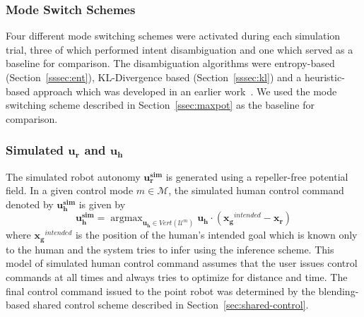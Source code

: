 \documentclass[conference]{IEEEtran}
\DeclareMathOperator*{\argmax}{argmax}
\begin{document}
\subsubsection{Mode Switch Schemes}
Four different mode switching schemes were activated during each simulation trial, three of which performed intent disambiguation and one which served as a baseline for comparison. The disambiguation algorithms were entropy-based (Section~\ref{sssec:ent}), KL-Divergence based (Section~\ref{sssec:kl}) and a heuristic-based approach which was developed in an earlier work~\citep{gopinath2017mode}. We used the mode switching scheme described in Section~\ref{ssec:maxpot} as the baseline for comparison. 
\subsubsection{Simulated $\boldsymbol{u_r}$ and $\boldsymbol{u_h}$}
The simulated robot autonomy $\boldsymbol{u^{sim}_r}$ is generated using a repeller-free potential field. In a given control mode $m \in \mathcal{M}$, the simulated human control command denoted by $\boldsymbol{u^{sim}_h}$ is given by
\begin{equation*}
\boldsymbol{u^{sim}_h} = \argmax_{\boldsymbol{u_h} \in Vert(\mathcal{U}^m)} \boldsymbol{u_h}\cdot(\boldsymbol{x_g}^{intended} - \boldsymbol{x_r})
\end{equation*}
where $\boldsymbol{x_g}^{intended}$ is the position of the human's intended goal which is known only to the human and the system tries to infer using the inference scheme. This model of simulated human control command assumes that the user issues control commands at all times and always tries to optimize for distance and time. The final control command issued to the point robot was determined by the blending-based shared control scheme described in Section~\ref{sec:shared-control}.
\end{document}
